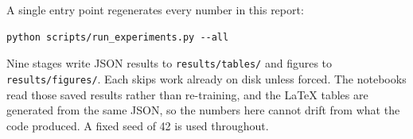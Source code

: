 A single entry point regenerates every number in this report:
 
\begin{verbatim}
python scripts/run_experiments.py --all
\end{verbatim}
 
Nine stages write JSON results to \texttt{results/tables/} and figures to
\texttt{results/figures/}. Each skips work already on disk unless forced. The
notebooks read those saved results rather than re-training, and the LaTeX tables
are generated from the same JSON, so the numbers here cannot drift from what the
code produced. A fixed seed of 42 is used throughout.
 